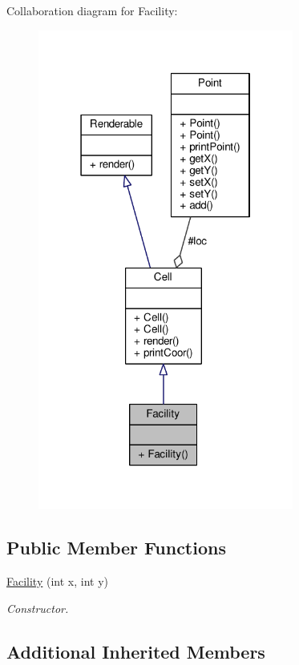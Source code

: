 Collaboration diagram for Facility\+:
\nopagebreak
\begin{figure}[H]
\begin{center}
\leavevmode
\includegraphics[width=238pt]{classFacility__coll__graph}
\end{center}
\end{figure}
\subsection*{Public Member Functions}
\begin{DoxyCompactItemize}
\item 
\hyperlink{classFacility_aca76f1d74522884d7c9cfc742db5b9e3}{Facility} (int x, int y)
\begin{DoxyCompactList}\small\item\em Constructor. \end{DoxyCompactList}\end{DoxyCompactItemize}
\subsection*{Additional Inherited Members}



